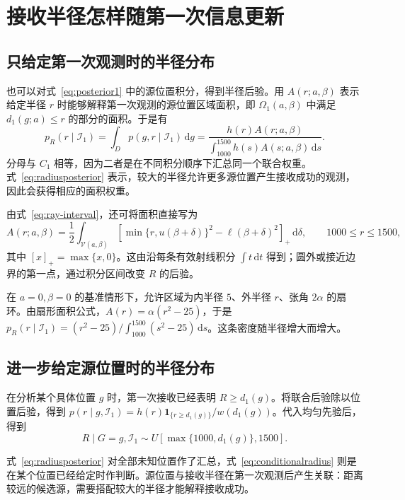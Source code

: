 \documentclass[UTF8,a4paper,zihao=-4,fontset=none]{ctexart}
\numberwithin{equation}{section}
\newcommand{\ind}{\mathbf 1}
\newcommand{\dd}{\,\mathrm d}
\begin{document}
\section{接收半径怎样随第一次信息更新}
\subsection{只给定第一次观测时的半径分布}
也可以对式~\eqref{eq:posterior1} 中的源位置积分，得到半径后验。用 \(A(r;a,\beta)\) 表示给定半径 \(r\) 时能够解释第一次观测的源位置区域面积，即 \(\Omega_1(a,\beta)\) 中满足 \(d_1(g;a)\le r\) 的部分的面积。于是有
\begin{equation}\label{eq:radiusposterior}
p_R(r\mid\mathcal I_1)
=\int_Dp(g,r\mid\mathcal I_1)\dd g
=\frac{h(r)A(r;a,\beta)}{\int_{1000}^{1500}h(s)A(s;a,\beta)\dd s}.
\end{equation}
分母与 \(C_1\) 相等，因为二者是在不同积分顺序下汇总同一个联合权重。式~\eqref{eq:radiusposterior} 表示，较大的半径允许更多源位置产生接收成功的观测，因此会获得相应的面积权重。

由式~\eqref{eq:ray-interval}，还可将面积直接写为
\begin{equation}\label{eq:area-ray}
A(r;a,\beta)=\frac12\int_{\mathcal V(a,\beta)}
\left[\min\{r,u(\beta+\delta)\}^2-\ell(\beta+\delta)^2\right]_+\dd\delta,
\qquad 1000\le r\le1500,
\end{equation}
其中 \([x]_+=\max\{x,0\}\)。这由沿每条有效射线积分 \(\int t\dd t\) 得到；圆外或接近边界的第一点，通过积分区间改变 \(R\) 的后验。

在 \(a=0,\beta=0\) 的基准情形下，允许区域为内半径 \(5\)、外半径 \(r\)、张角 \(2\alpha\) 的扇环。由扇形面积公式，\(A(r)=\alpha(r^2-25)\)，于是 \(p_R(r\mid\mathcal I_1)=(r^2-25)/\int_{1000}^{1500}(s^2-25)\dd s\)。这条密度随半径增大而增大。

\subsection{进一步给定源位置时的半径分布}
在分析某个具体位置 \(g\) 时，第一次接收已经表明 \(R\ge d_1(g)\)。将联合后验除以位置后验，得到 \(p(r\mid g,\mathcal I_1)=h(r)\ind_{\{r\ge d_1(g)\}}/w(d_1(g))\)。代入均匀先验后，得到
\begin{equation}\label{eq:conditionalradius}
R\mid G=g,\mathcal I_1
\sim U\!\left[\max\{1000,d_1(g)\},1500\right].
\end{equation}

式~\eqref{eq:radiusposterior} 对全部未知位置作了汇总，式~\eqref{eq:conditionalradius} 则是在某个位置已经给定时作判断。源位置与接收半径在第一次观测后产生关联：距离较远的候选源，需要搭配较大的半径才能解释接收成功。
\end{document}
